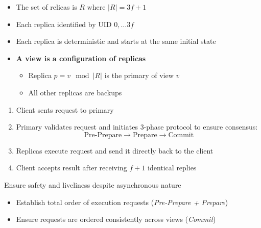\documentclass{easyclass}
\begin{document}
\begin{prf}[Algorithm]{}
\begin{itemize}
    \item The set of relicas is $R$ where $\vert R \vert = 3f+1$
    \item Each replica identified by UID $0, \hdots 3f$
    \item Each replica is deterministic and starts at the same initial state
    \item \textbf{A view is a configuration of replicas}
    \begin{itemize}
        \item Replica $p = v \mod \vert R \vert$ is the primary of view $v$
        \item All other replicas are backups
    \end{itemize}
\end{itemize}

\begin{enumerate}
    \item Client sents request to primary
    \item Primary validates request and initiates 3-phase protocol to ensure consensus:
    \[\text{Pre-Prepare} \rightarrow \text{Prepare} \rightarrow \text{Commit}\]
    \item Replicas execute request and send it directly back to the client
    \item Client accepts result after receiving $f+1$ identical replies
\end{enumerate}
\end{prf}

\begin{theo}{}
    Ensure safety and liveliness despite asynchronous nature
    \begin{itemize}
        \item Establish total order of execution requests (\emph{Pre-Prepare + Prepare})
        \item Ensure requests are ordered consistently across views (\emph{Commit})
    \end{itemize}
\end{theo}
\end{document}
